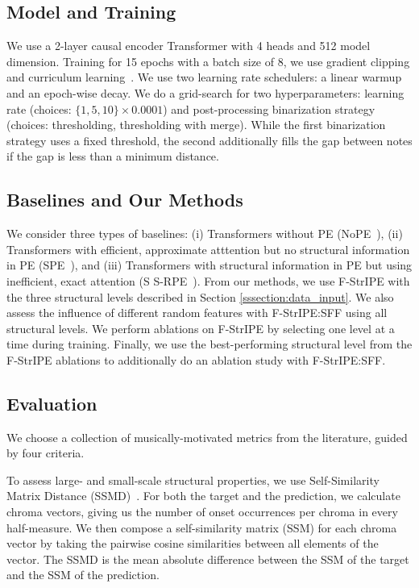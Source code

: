 \subsection{Model and Training}
We use a 2-layer causal encoder Transformer with 4 heads and 512 model dimension. Training for 15 epochs with a batch size of 8, we use gradient clipping and curriculum learning~\cite{bengio_curriculum_2009}. We use two learning rate schedulers: a linear warmup and an epoch-wise decay.
We do a grid-search for two hyperparameters: learning rate (choices: $\{ 1, 5, 10 \} \times 0.0001$) and post-processing binarization strategy~\cite{agarwal_structure_2024} (choices: thresholding, thresholding with merge). While the first binarization strategy uses a fixed threshold, the second additionally fills the gap between notes if the gap is less than a minimum distance.

\subsection{Baselines and Our Methods} \label{sssection:baselines}
We consider three types of baselines: (i) Transformers without PE (NoPE~\cite{tsai_transformer_2019,haviv_transformer_2022}), (ii) Transformers with efficient, approximate atttention but no structural information in PE (SPE~\cite{liutkus_relative_2021}), and (iii) Transformers with structural information in PE but using inefficient, exact attention (S S-RPE~\cite{agarwal_structure_2024}).
From our methods, we use F-StrIPE with the three structural levels described in Section \ref{sssection:data_input}. We also assess the influence of different random features with F-StrIPE:SFF using all structural levels. 
We perform ablations on F-StrIPE by selecting one level at a time during training. Finally, we use the best-performing structural level from the F-StrIPE ablations to additionally do an ablation study with F-StrIPE:SFF.

\subsection{Evaluation}
We choose a collection of musically-motivated metrics from the literature, guided by four criteria. 

To assess large- and small-scale structural properties, we use Self-Similarity Matrix Distance (SSMD)~\cite{wu_musemorphose_2021}. For both the target and the prediction, we calculate chroma vectors, giving us the number of onset occurrences per chroma in every half-measure. We then compose a self-similarity matrix (SSM) for each chroma vector by taking the pairwise cosine similarities between all elements of the vector. The SSMD is the mean absolute difference between the SSM of the target and the SSM of the prediction.

